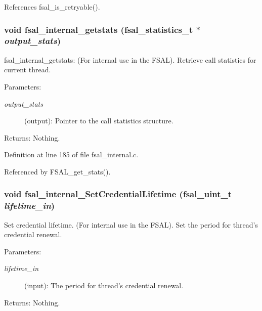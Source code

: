 References fsal\_\-is\_\-retryable().
\subsubsection{\setlength{\rightskip}{0pt plus 5cm}void fsal\_\-internal\_\-getstats (fsal\_\-statistics\_\-t $\ast$ {\em output\_\-stats})}\label{fsal__internal_8c_a15}


fsal\_\-internal\_\-getstats: (For internal use in the FSAL). Retrieve call statistics for current thread.

\begin{Desc}
\item[Parameters:]
\begin{description}
\item[{\em output\_\-stats}](output): Pointer to the call statistics structure.\end{description}
\end{Desc}
\begin{Desc}
\item[Returns:]Nothing. \end{Desc}


Definition at line 185 of file fsal\_\-internal.c.

Referenced by FSAL\_\-get\_\-stats().
\subsubsection{\setlength{\rightskip}{0pt plus 5cm}void fsal\_\-internal\_\-Set\-Credential\-Lifetime (fsal\_\-uint\_\-t {\em lifetime\_\-in})}\label{fsal__internal_8c_a16}


Set credential lifetime. (For internal use in the FSAL). Set the period for thread's credential renewal.

\begin{Desc}
\item[Parameters:]
\begin{description}
\item[{\em lifetime\_\-in}](input): The period for thread's credential renewal.\end{description}
\end{Desc}
\begin{Desc}
\item[Returns:]Nothing. \end{Desc}


